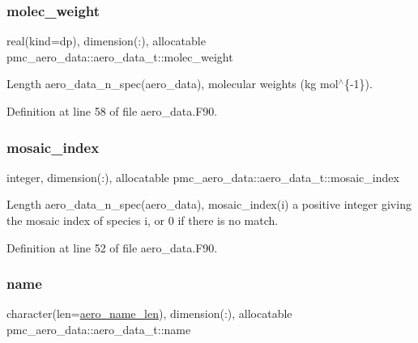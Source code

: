 \subsubsection{\texorpdfstring{molec\+\_\+weight}{molec\_weight}}
{\footnotesize\ttfamily real(kind=dp), dimension(\+:), allocatable pmc\+\_\+aero\+\_\+data\+::aero\+\_\+data\+\_\+t\+::molec\+\_\+weight}



Length {\ttfamily aero\+\_\+data\+\_\+n\+\_\+spec(aero\+\_\+data)}, molecular weights (kg mol$^\wedge$\{-\/1\}). 



Definition at line 58 of file aero\+\_\+data.\+F90.

\mbox{\label{structpmc__aero__data_1_1aero__data__t_a200054b5f1899b689afdc41530ae6079}} 
\subsubsection{\texorpdfstring{mosaic\+\_\+index}{mosaic\_index}}
{\footnotesize\ttfamily integer, dimension(\+:), allocatable pmc\+\_\+aero\+\_\+data\+::aero\+\_\+data\+\_\+t\+::mosaic\+\_\+index}



Length {\ttfamily aero\+\_\+data\+\_\+n\+\_\+spec(aero\+\_\+data)}, mosaic\+\_\+index(i) a positive integer giving the mosaic index of species i, or 0 if there is no match. 



Definition at line 52 of file aero\+\_\+data.\+F90.

\mbox{\label{structpmc__aero__data_1_1aero__data__t_afb8febbf8e8e40a57e0be7a992282dd8}} 
\subsubsection{\texorpdfstring{name}{name}}
{\footnotesize\ttfamily character(len=\mbox{\hyperlink{namespacepmc__aero__data_a05ba86cdbb1bbbacbbc41cce6eba6474}{aero\+\_\+name\+\_\+len}}), dimension(\+:), allocatable pmc\+\_\+aero\+\_\+data\+::aero\+\_\+data\+\_\+t\+::name}




